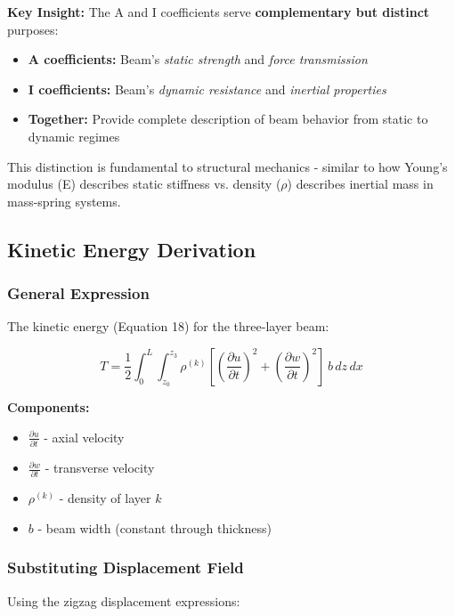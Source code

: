 \documentclass[12pt,a4paper]{article}
\begin{document}
\textbf{Key Insight:} The A and I coefficients serve \textbf{complementary but distinct} purposes:
\begin{itemize}
\item \textbf{A coefficients:} Beam's \textit{static strength} and \textit{force transmission}
\item \textbf{I coefficients:} Beam's \textit{dynamic resistance} and \textit{inertial properties}
\item \textbf{Together:} Provide complete description of beam behavior from static to dynamic regimes
\end{itemize}

This distinction is fundamental to structural mechanics - similar to how Young's modulus (E) describes static stiffness vs. density ($\rho$) describes inertial mass in mass-spring systems.

\subsection{Kinetic Energy Derivation}

\subsubsection{General Expression}

The kinetic energy (Equation 18) for the three-layer beam:

\begin{equation}
T = \frac{1}{2} \int_0^L \int_{z_0}^{z_3} \rho^{(k)}
\left[ \left(\frac{\partial u}{\partial t}\right)^2
     + \left(\frac{\partial w}{\partial t}\right)^2 \right]
\, b \, dz \, dx
\end{equation}

\textbf{Components:}
\begin{itemize}
\item $\frac{\partial u}{\partial t}$ - axial velocity
\item $\frac{\partial w}{\partial t}$ - transverse velocity
\item $\rho^{(k)}$ - density of layer $k$
\item $b$ - beam width (constant through thickness)
\end{itemize}

\subsubsection{Substituting Displacement Field}

Using the zigzag displacement expressions:
\end{document}

